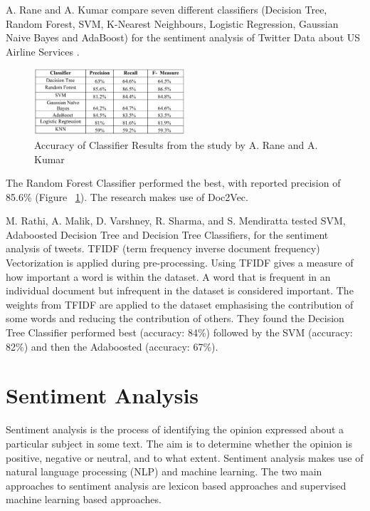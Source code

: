 A. Rane and A. Kumar compare seven different classifiers (Decision Tree, Random Forest, SVM, K-Nearest Neighbours, Logistic Regression, Gaussian Naive Bayes and AdaBoost) for the sentiment analysis of Twitter Data about US Airline Services \cite{Rane2018}. 
\begin{figure}
    \centering
    \setlength{\belowcaptionskip}{-10pt}
    \includegraphics[width=0.5\textwidth]{literature_review/arane_classifier_results.PNG}
    \caption{Accuracy of Classifier Results from the study by A. Rane and A. Kumar \cite{Rane2018}}
    \label{fig:arane}
\end{figure}
The Random Forest Classifier performed the best, with reported precision of 85.6\% (Figure ~\ref{fig:arane}). The research makes use of Doc2Vec.

M. Rathi, A. Malik, D. Varshney, R. Sharma, and S. Mendiratta \cite{Raithi2018} tested SVM, Adaboosted Decision Tree and Decision Tree Classifiers, for the sentiment analysis of tweets. TFIDF (term frequency inverse document frequency) Vectorization is applied during pre-processing. Using TFIDF gives a measure of how important a word is within the dataset. A word that is frequent in an individual document but infrequent in the dataset is considered important. The weights from TFIDF are applied to the dataset emphasising the contribution of some words and reducing the contribution of others. They found the Decision Tree Classifier performed best  (accuracy: 84\%) followed by the SVM (accuracy: 82\%) and then the Adaboosted (accuracy: 67\%). 

\section{Sentiment Analysis}

Sentiment analysis is the process of identifying the opinion expressed about a particular subject in some text. The aim is to determine whether the opinion is positive, negative or neutral, and to what extent. Sentiment analysis makes use of natural language processing (NLP) and machine learning. The two main approaches to sentiment analysis are lexicon based approaches and supervised machine learning based approaches. 

